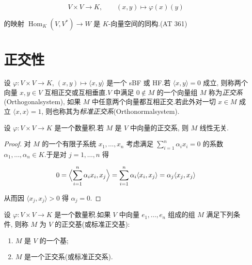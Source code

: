 \[
V \times V \longrightarrow K, \qquad (x, y) \longmapsto \varphi(x)(y)
\]

的映射 $\operatorname{Hom}_K(V, V^*) \longrightarrow W$ 是 $K$-向量空间的同构.(AT 361)

\section{正交性}\label{sec:7.2}

\begin{definition}[正交]\label{def:7.2.1}
设 $\varphi \colon V \times V \longrightarrow K$, $(x, y) \longmapsto \langle x, y \rangle$ 是一个 sBF 或 HF.若 $\langle x, y \rangle = 0$ 成立, 则称两个向量 $x, y \in V$ 互相正交或互相垂直.$V$ 中满足 $0 \notin M$ 的一个向量组 $M$ 称为\emph{正交系}(\textup{Orthogonalsystem}), 如果 $M$ 中任意两个向量都互相正交.若此外对一切 $x \in M$ 成立 $\langle x, x \rangle = 1$, 则也称其为\emph{标准正交系}(\textup{Orthonormalsystem}).
\end{definition}

\begin{remark}\label{rem:7.2.2}
设 $\varphi \colon V \times V \longrightarrow K$ 是一个数量积.若 $M$ 是 $V$ 中向量的正交系, 则 $M$ 线性无关.
\end{remark}

\begin{proof}
对 $M$ 的一个有限子系统 $x_1, \ldots, x_n$ 考虑满足 $\sum_{i = 1}^{n} \alpha_i x_i = 0$ 的系数 $\alpha_1, \ldots, \alpha_n \in K$.于是对 $j = 1, \ldots, n$ 得

\[
0 = \Bigl\langle \sum_{i = 1}^{n} \alpha_i x_i, x_j \Bigr\rangle = \sum_{i = 1}^{n} \alpha_i \langle x_i, x_j \rangle = \alpha_j \langle x_j, x_j \rangle
\]

从而因 $\langle x_j, x_j \rangle > 0$ 得 $\alpha_j = 0$.
\end{proof}

\begin{definition}[正交基与标准正交基]\label{def:7.2.3}
设 $\varphi \colon V \times V \longrightarrow K$ 是一个数量积.如果 $V$ 中向量 $e_1, \ldots, e_n$ 组成的组 $M$ 满足下列条件, 则称 $M$ 为 $V$ 的正交基(或标准正交基):
\begin{enumerate}
\item[(i)] $M$ 是 $V$ 的一个基;
\item[(ii)] $M$ 是一个正交系(或标准正交系).
\end{enumerate}
\end{definition}


